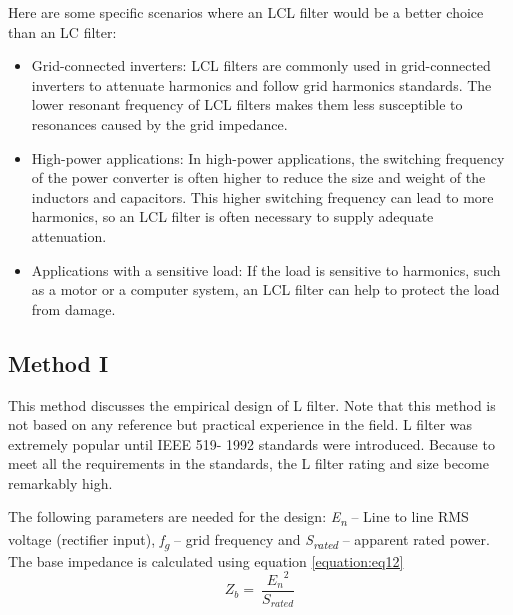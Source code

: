 \documentclass[12pt,a4paper]{book}
\begin{document}
Here are some specific scenarios where an LCL filter would be a better choice than an LC filter:
\begin{itemize}
  \item Grid-connected inverters: LCL filters are commonly used in grid-connected inverters to attenuate harmonics and follow grid harmonics standards. The lower resonant frequency of LCL filters makes them less susceptible to resonances caused by the grid impedance.
  \item High-power applications: In high-power applications, the switching frequency of the power converter is often higher to reduce the size and weight of the inductors and capacitors. This higher switching frequency can lead to more harmonics, so an LCL filter is often necessary to supply adequate attenuation.
  \item Applications with a sensitive load: If the load is sensitive to harmonics, such as a motor or a computer system, an LCL filter can help to protect the load from damage.
\end{itemize}

\subsection{Method I}
This method discusses the empirical design of L filter. Note that this method is not based on any reference but practical experience in the field. L filter was extremely popular until IEEE 519- 1992 standards were introduced. Because to meet all the requirements in the standards, the L filter rating and size become remarkably high.

The following parameters are needed for the design: \emph{E\textsubscript{n}} -- Line to line RMS voltage (rectifier input), \emph{f\textsubscript{g}} -- grid frequency and \emph{S\textsubscript{rated}} -- apparent rated power. The base impedance is calculated using equation \ref{equation:eq12}
\begin{equation}
  Z_{b} = \ \frac{{E_{n}}^{2}}{S_{rated}}
  \label{equation:eq12}
\end{equation}
\end{document}

